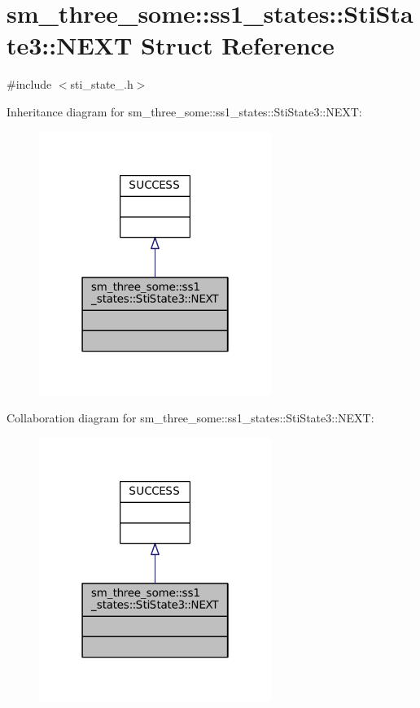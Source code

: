 \hypertarget{structsm__three__some_1_1ss1__states_1_1StiState3_1_1NEXT}{}\section{sm\+\_\+three\+\_\+some\+:\+:ss1\+\_\+states\+:\+:Sti\+State3\+:\+:N\+E\+XT Struct Reference}
\label{structsm__three__some_1_1ss1__states_1_1StiState3_1_1NEXT}


{\ttfamily \#include $<$sti\+\_\+state\+\_.\+h$>$}



Inheritance diagram for sm\+\_\+three\+\_\+some\+:\+:ss1\+\_\+states\+:\+:Sti\+State3\+:\+:N\+E\+XT\+:
\nopagebreak
\begin{figure}[H]
\begin{center}
\leavevmode
\includegraphics[width=214pt]{structsm__three__some_1_1ss1__states_1_1StiState3_1_1NEXT__inherit__graph}
\end{center}
\end{figure}


Collaboration diagram for sm\+\_\+three\+\_\+some\+:\+:ss1\+\_\+states\+:\+:Sti\+State3\+:\+:N\+E\+XT\+:
\nopagebreak
\begin{figure}[H]
\begin{center}
\leavevmode
\includegraphics[width=214pt]{structsm__three__some_1_1ss1__states_1_1StiState3_1_1NEXT__coll__graph}
\end{center}
\end{figure}


